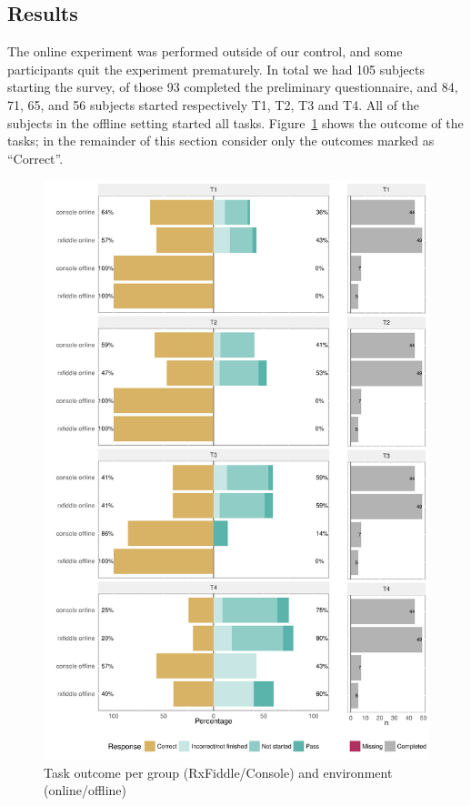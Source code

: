 \subsection{Results}
The online experiment was performed outside of our control, and some participants quit the experiment prematurely. In total we had 105 subjects starting the survey, of those 93 completed the preliminary questionnaire, and 84, 71, 65, and 56 subjects started respectively T1, T2, T3 and T4. All of the subjects in the offline setting started all tasks. Figure~\ref{fig:resultPerTask} shows the outcome of the tasks; in the remainder of this section consider only the outcomes marked as ``Correct''.

\begin{figure}[t]
\includegraphics[width=\columnwidth]{images/resultPerTask.pdf}
\caption{Task outcome per group (RxFiddle/Console) and environment (online/offline)}
\label{fig:resultPerTask}
\end{figure}

